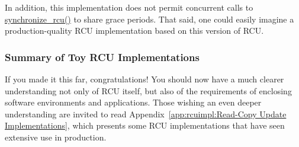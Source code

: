 In addition, this implementation does not permit concurrent calls
to \url{synchronize_rcu()} to share grace periods.
That said, one could easily imagine a production-quality RCU
implementation based on this version of RCU.

\subsubsection{Summary of Toy RCU Implementations}
\label{defer:Summary of Toy RCU Implementations}

If you made it this far, congratulations!
You should now have a much clearer understanding
not only of RCU itself, but also of the requirements of enclosing
software environments and applications.
Those wishing an even deeper understanding are invited to read
Appendix~\ref{app:rcuimpl:Read-Copy Update Implementations},
which presents some RCU implementations that have seen extensive
use in production.

